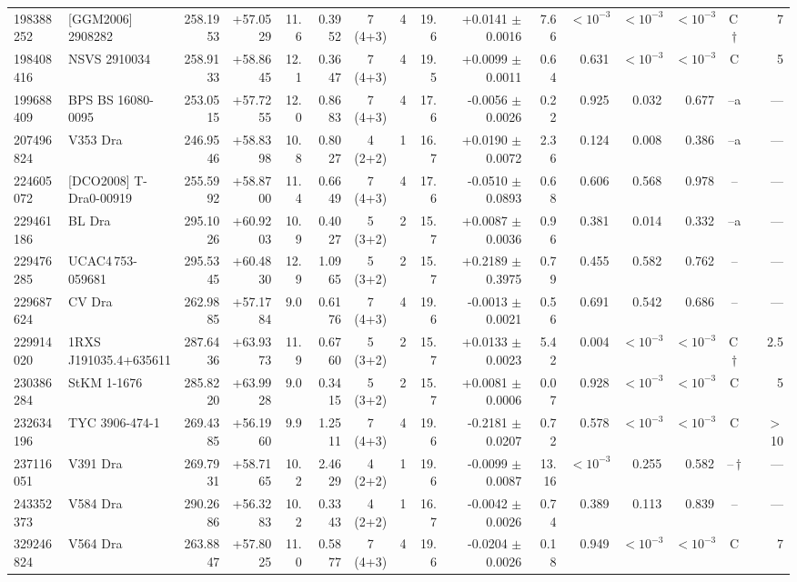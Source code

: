 \documentclass{aa}
\begin{document}
\begin{table}
\begin{tabular}{l l r r r r c c r r r r r r c r}
198388252 & [GGM2006] 2908282 & 258.1953 & +57.0529 & 11.6 & 0.3952 & 7 (4+3) & 4 & 19.6 & +0.0141 $\pm$ 0.0016 & 7.66 & $<10^{-3}$ & $<10^{-3}$ & $<10^{-3}$ & C\,$\dagger$ & 7\\
198408416 & NSVS 2910034 & 258.9133 & +58.8645 & 12.1 & 0.3647 & 7 (4+3) & 4 & 19.5 & +0.0099 $\pm$ 0.0011 & 0.64 & 0.631 & $<10^{-3}$ & $<10^{-3}$ & C & 5\\
199688409 & BPS BS 16080-0095 & 253.0515 & +57.7255 & 12.0 & 0.8683 & 7 (4+3) & 4 & 17.6 & -0.0056 $\pm$ 0.0026 & 0.22 & 0.925 & 0.032 & 0.677 & --a & ---\\
207496824 & V353 Dra & 246.9546 & +58.8398 & 10.8 & 0.8027 & 4 (2+2) & 1 & 16.7 & +0.0190 $\pm$ 0.0072 & 2.36 & 0.124 & 0.008 & 0.386 & --a & ---\\
224605072 & [DCO2008] T-Dra0-00919 & 255.5992 & +58.8700 & 11.4 & 0.6649 & 7 (4+3) & 4 & 17.6 & -0.0510 $\pm$ 0.0893 & 0.68 & 0.606 & 0.568 & 0.978 & -- & ---\\
229461186 & BL Dra & 295.1026 & +60.9203 & 10.9 & 0.4027 & 5 (3+2) & 2 & 15.7 & +0.0087 $\pm$ 0.0036 & 0.96 & 0.381 & 0.014 & 0.332 & --a & ---\\
229476285 & UCAC4\,753-059681 & 295.5345 & +60.4830 & 12.9 & 1.0965 & 5 (3+2) & 2 & 15.7 & +0.2189 $\pm$ 0.3975 & 0.79 & 0.455 & 0.582 & 0.762 & -- & ---\\
229687624 & CV Dra & 262.9885 & +57.1784 & 9.0 & 0.6176 & 7 (4+3) & 4 & 19.6 & -0.0013 $\pm$ 0.0021 & 0.56 & 0.691 & 0.542 & 0.686 & -- & ---\\
229914020 & 1RXS J191035.4+635611 & 287.6436 & +63.9373 & 11.9 & 0.6760 & 5 (3+2) & 2 & 15.7 & +0.0133 $\pm$ 0.0023 & 5.42 & 0.004 & $<10^{-3}$ & $<10^{-3}$ & C\,$\dagger$ & 2.5\\
230386284 & StKM 1-1676 & 285.8220 & +63.9928 & 9.0 & 0.3415 & 5 (3+2) & 2 & 15.7 & +0.0081 $\pm$ 0.0006 & 0.07 & 0.928 & $<10^{-3}$ & $<10^{-3}$ & C & 5\\
232634196 & TYC 3906-474-1 & 269.4385 & +56.1960 & 9.9 & 1.2511 & 7 (4+3) & 4 & 19.6 & -0.2181 $\pm$ 0.0207 & 0.72 & 0.578 & $<10^{-3}$ & $<10^{-3}$ & C & $>$ 10\\
237116051 & V391 Dra & 269.7931 & +58.7165 & 10.2 & 2.4629 & 4 (2+2) & 1 & 19.6 & -0.0099 $\pm$ 0.0087 & 13.16 & $<10^{-3}$ & 0.255 & 0.582 & --\,$\dagger$ & ---\\
243352373 & V584 Dra & 290.2686 & +56.3283 & 10.2 & 0.3343 & 4 (2+2) & 1 & 16.7 & -0.0042 $\pm$ 0.0026 & 0.74 & 0.389 & 0.113 & 0.839 & -- & ---\\
329246824 & V564 Dra & 263.8847 & +57.8025 & 11.0 & 0.5877 & 7 (4+3) & 4 & 19.6 & -0.0204 $\pm$ 0.0026 & 0.18 & 0.949 & $<10^{-3}$ & $<10^{-3}$ & C & 7\\

\end{tabular}
\end{table}
\end{document}
